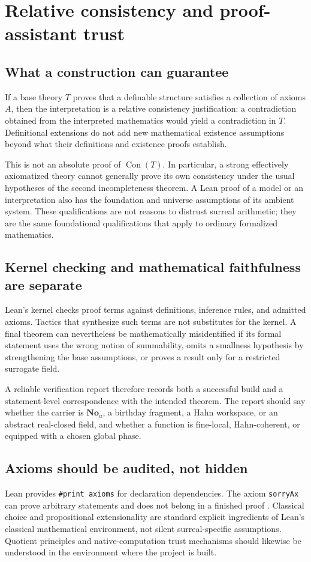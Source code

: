 \documentclass[11pt,letterpaper]{article}
\numberwithin{equation}{section}
\theoremstyle{definition}
\theoremstyle{remark}
\newcommand{\No}{\mathbf{No}}
\newcommand{\Con}{\operatorname{Con}}
\begin{document}
\section{Relative consistency and proof-assistant trust}\label{sec:trust}
\subsection{What a construction can guarantee}
If a base theory $T$ proves that a definable structure satisfies a collection of axioms $A$, then the interpretation is a relative consistency justification: a contradiction obtained from the interpreted mathematics would yield a contradiction in $T$. Definitional extensions do not add new mathematical existence assumptions beyond what their definitions and existence proofs establish.

This is not an absolute proof of $\Con(T)$. In particular, a strong effectively axiomatized theory cannot generally prove its own consistency under the usual hypotheses of the second incompleteness theorem. A Lean proof of a model or an interpretation also has the foundation and universe assumptions of its ambient system. These qualifications are not reasons to distrust surreal arithmetic; they are the same foundational qualifications that apply to ordinary formalized mathematics.

\subsection{Kernel checking and mathematical faithfulness are separate}
Lean's kernel checks proof terms against definitions, inference rules, and admitted axioms. Tactics that synthesize such terms are not substitutes for the kernel. A final theorem can nevertheless be mathematically misidentified if its formal statement uses the wrong notion of summability, omits a smallness hypothesis by strengthening the base assumptions, or proves a result only for a restricted surrogate field.

A reliable verification report therefore records both a successful build and a statement-level correspondence with the intended theorem. The report should say whether the carrier is $\No_u$, a birthday fragment, a Hahn workspace, or an abstract real-closed field, and whether a function is fine-local, Hahn-coherent, or equipped with a chosen global phase.

\subsection{Axioms should be audited, not hidden}
Lean provides \texttt{\#print axioms} for declaration dependencies. The axiom \texttt{sorryAx} can prove arbitrary statements and does not belong in a finished proof \cite{LeanAxioms}. Classical choice and propositional extensionality are standard explicit ingredients of Lean's classical mathematical environment, not silent surreal-specific assumptions. Quotient principles and native-computation trust mechanisms should likewise be understood in the environment where the project is built.
\end{document}
